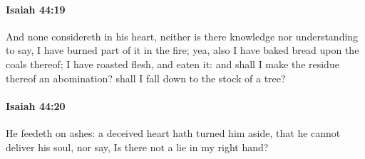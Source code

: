 		\paragraph{Isaiah 44:19} %
			\label{ISAIAH-44-19}

			And none considereth in his heart, neither is there knowledge nor understanding to say, I have burned part of it in the fire; yea, also I have baked bread upon the coals thereof; I have roasted flesh, and eaten it: and shall I make the residue thereof an abomination? shall I fall down to the stock of a tree?


		\paragraph{Isaiah 44:20} %
			\label{ISAIAH-44-20}

			He feedeth on ashes: a deceived heart hath turned him aside, that he cannot deliver his soul, nor say, Is there not a lie in my right hand?

